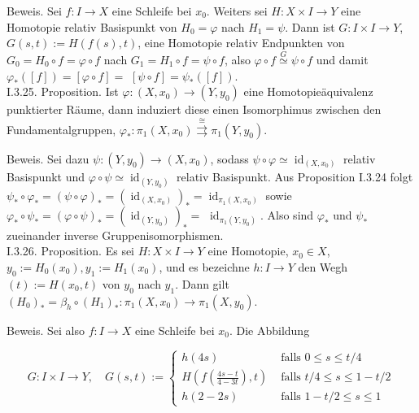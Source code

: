 \documentclass[10pt]{article}
\begin{document}
Beweis. Sei $f: I \rightarrow X$ eine Schleife bei $x_{0}$. Weiters sei $H: X \times I \rightarrow Y$ eine Homotopie relativ Basispunkt von $H_{0}=\varphi$ nach $H_{1}=\psi$. Dann ist $G: I \times I \rightarrow Y$, $G(s, t):=H(f(s), t)$, eine Homotopie relativ Endpunkten von $G_{0}=H_{0} \circ f=\varphi \circ f$ nach $G_{1}=H_{1} \circ f=\psi \circ f$, also $\varphi \circ f \stackrel{G}{\simeq} \psi \circ f$ und damit $\varphi_{*}([f])=[\varphi \circ f]=$ $[\psi \circ f]=\psi_{*}([f])$.\\
I.3.25. Proposition. Ist $\varphi:\left(X, x_{0}\right) \rightarrow\left(Y, y_{0}\right)$ eine Homotopieäquivalenz punktierter Räume, dann induziert diese einen Isomorphimus zwischen den Fundamentalgruppen, $\varphi_{*}: \pi_{1}\left(X, x_{0}\right) \stackrel{\cong}{\rightrightarrows} \pi_{1}\left(Y, y_{0}\right)$.

Beweis. Sei dazu $\psi:\left(Y, y_{0}\right) \rightarrow\left(X, x_{0}\right)$, sodass $\psi \circ \varphi \simeq \operatorname{id}_{\left(X, x_{0}\right)}$ relativ Basispunkt und $\varphi \circ \psi \simeq \operatorname{id}_{\left(Y, y_{0}\right)}$ relativ Basispunkt. Aus Proposition I.3.24 folgt $\psi_{*} \circ \varphi_{*}=(\psi \circ \varphi)_{*}=\left(\operatorname{id}_{\left(X, x_{0}\right)}\right)_{*}=\operatorname{id}_{\pi_{1}\left(X, x_{0}\right)}$ sowie $\varphi_{*} \circ \psi_{*}=(\varphi \circ \psi)_{*}=\left(\operatorname{id}_{\left(Y, y_{0}\right)}\right)_{*}=$ $\operatorname{id}_{\pi_{1}\left(Y, y_{0}\right)}$. Also sind $\varphi_{*}$ und $\psi_{*}$ zueinander inverse Gruppenisomorphismen.\\
I.3.26. Proposition. Es sei $H: X \times I \rightarrow Y$ eine Homotopie, $x_{0} \in X$, $y_{0}:=H_{0}\left(x_{0}\right), y_{1}:=H_{1}\left(x_{0}\right)$, und es bezeichne $h: I \rightarrow Y$ den Wegh $(t):=H\left(x_{0}, t\right)$ von $y_{0}$ nach $y_{1}$. Dann gilt $\left(H_{0}\right)_{*}=\beta_{h} \circ\left(H_{1}\right)_{*}: \pi_{1}\left(X, x_{0}\right) \rightarrow \pi_{1}\left(X, y_{0}\right)$.

Beweis. Sei also $f: I \rightarrow X$ eine Schleife bei $x_{0}$. Die Abbildung

$$
G: I \times I \rightarrow Y, \quad G(s, t):= \begin{cases}h(4 s) & \text { falls } 0 \leq s \leq t / 4 \\ H\left(f\left(\frac{4 s-t}{4-3 t}\right), t\right) & \text { falls } t / 4 \leq s \leq 1-t / 2 \\ h(2-2 s) & \text { falls } 1-t / 2 \leq s \leq 1\end{cases}
$$
\end{document}
